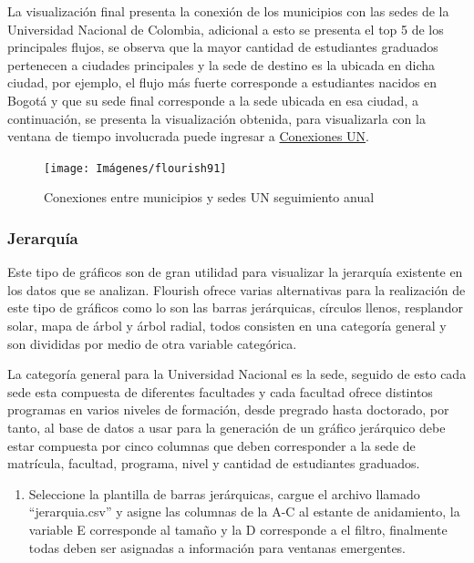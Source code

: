 \documentclass[
]{book}
\providecommand{\tightlist}{%
  \setlength{\itemsep}{0pt}\setlength{\parskip}{0pt}}
\begin{document}
La visualización final presenta la conexión de los municipios con las sedes de la Universidad Nacional de Colombia, adicional a esto se presenta el top 5 de los principales flujos, se observa que la mayor cantidad de estudiantes graduados pertenecen a ciudades principales y la sede de destino es la ubicada en dicha ciudad, por ejemplo, el flujo más fuerte corresponde a estudiantes nacidos en Bogotá y que su sede final corresponde a la sede ubicada en esa ciudad, a continuación, se presenta la visualización obtenida, para visualizarla con la ventana de tiempo involucrada puede ingresar a \href{https://preview.flourish.studio/5534480/cT-u7gNBx4zbjdJqezzhTCiUcOCbuiMhxIRS6JM0hZ8KHH2jDhVtFajBX7F0x1IB/}{Conexiones UN}.

\begin{figure}

{\centering \texttt{[image: Imágenes/flourish91]} 

}

\caption{Conexiones entre municipios y sedes UN seguimiento anual}\label{fig:finalgloboconexionesflourish-fig}
\end{figure}

\hypertarget{jerarquiaflourish}{%
\subsubsection{Jerarquía}\label{jerarquiaflourish}}

Este tipo de gráficos son de gran utilidad para visualizar la jerarquía existente en los datos que se analizan. Flourish ofrece varias alternativas para la realización de este tipo de gráficos como lo son las barras jerárquicas, círculos llenos, resplandor solar, mapa de árbol y árbol radial, todos consisten en una categoría general y son divididas por medio de otra variable categórica.

La categoría general para la Universidad Nacional es la sede, seguido de esto cada sede esta compuesta de diferentes facultades y cada facultad ofrece distintos programas en varios niveles de formación, desde pregrado hasta doctorado, por tanto, al base de datos a usar para la generación de un gráfico jerárquico debe estar compuesta por cinco columnas que deben corresponder a la sede de matrícula, facultad, programa, nivel y cantidad de estudiantes graduados.

\begin{enumerate}
\def\labelenumi{\arabic{enumi}.}
\tightlist
\item
  Seleccione la plantilla de barras jerárquicas, cargue el archivo llamado ``jerarquia.csv'' y asigne las columnas de la A-C al estante de anidamiento, la variable E corresponde al tamaño y la D corresponde a el filtro, finalmente todas deben ser asignadas a información para ventanas emergentes.
\end{enumerate}
\end{document}
